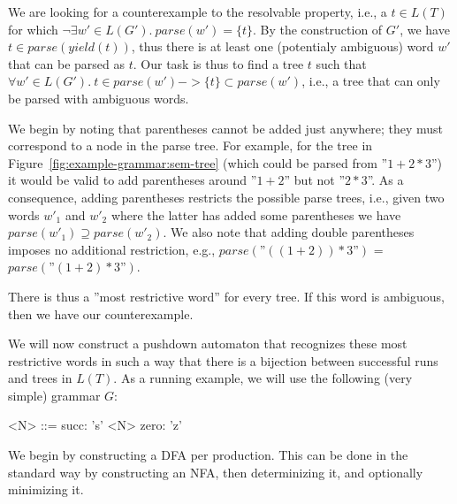 \documentclass[sigplan]{acmart}\settopmatter{printfolios=true,printccs=false,printacmref=false}
\newcommand{\yield}{\mathit{yield}} %
\newcommand{\parse}{\mathit{parse}} %
\begin{document}
We are looking for a counterexample to the resolvable property, i.e., a $t \in L(T)$ for which $\lnot \exists w' \in L(G').\ \parse(w') = \{t\}$. By the construction of $G'$, we have $t \in \parse(\yield(t))$, thus there is at least one (potentialy ambiguous) word $w'$ that can be parsed as $t$. Our task is thus to find a tree $t$ such that $\forall w' \in L(G').\ t \in \parse(w') -> \{t\} \subset \parse(w')$, i.e., a tree that can only be parsed with ambiguous words.

We begin by noting that parentheses cannot be added just anywhere; they must correspond to a node in the parse tree. For example, for the tree in Figure~\ref{fig:example-grammar:sem-tree} (which could be parsed from ''$1 + 2 * 3$'') it would be valid to add parentheses around ''$1 + 2$'' but not ''$2 * 3$''. As a consequence, adding parentheses restricts the possible parse trees, i.e., given two words $w'_1$ and $w'_2$ where the latter has added some parentheses we have $\parse(w'_1) \supseteq \parse(w'_2)$. We also note that adding double parentheses imposes no additional restriction, e.g., $\parse(\text{''}((1 + 2)) * 3\text{''})$ = $\parse(\text{''}(1 + 2) * 3\text{''})$.

There is thus a ''most restrictive word'' for every tree. If this word is ambiguous, then we have our counterexample. %

We will now construct a pushdown automaton that recognizes these most restrictive words in such a way that there is a bijection between successful runs and trees in $L(T)$. As a running example, we will use the following (very simple) grammar $G$:

\setlength{\grammarindent}{3.5em}
\begin{grammar}
  <N> ::= succ: 's' <N>
    \alt zero: 'z'
\end{grammar}

\noindent We begin by constructing a DFA per production. This can be done in the standard way by constructing an NFA, then determinizing it, and optionally minimizing it.

\begin{center}
\end{center}
\end{document}
